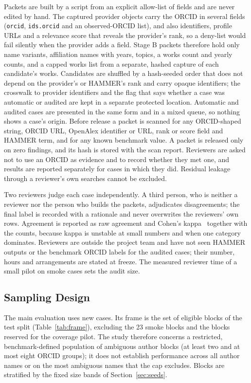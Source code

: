Packets are built by a script from an explicit allow-list of fields and are never edited by hand. The captured provider objects carry the ORCID in several fields (\texttt{orcid}, \texttt{ids.orcid} and an observed-ORCID list), and also identifiers, profile URLs and a relevance score that reveals the provider's rank, so a deny-list would fail silently when the provider adds a field. Stage B packets therefore hold only name variants, affiliation names with years, topics, a works count and yearly counts, and a capped works list from a separate, hashed capture of each candidate's works. Candidates are shuffled by a hash-seeded order that does not depend on the provider's or HAMMER's rank and carry opaque identifiers; the crosswalk to provider identifiers and the flag that says whether a case was automatic or audited are kept in a separate protected location. Automatic and audited cases are presented in the same form and in a mixed queue, so nothing shows a case's origin. Before release a packet is scanned for any ORCID-shaped string, ORCID URL, OpenAlex identifier or URL, rank or score field and HAMMER term, and for any known benchmark value. A packet is released only on zero findings, and its hash is stored with the scan report. Reviewers are asked not to use an ORCID as evidence and to record whether they met one, and results are reported separately for cases in which they did. Residual leakage through a reviewer's own searches cannot be excluded.

Two reviewers judge each case independently. A third person, who is neither a reviewer nor the person who builds the packets, adjudicates disagreements; the final label is recorded with a rationale and never overwrites the reviewers' own rows. Agreement is reported as raw agreement and Cohen's kappa~\cite{cohen1960kappa} together with the counts, because kappa is unstable at small numbers and when one category dominates. Reviewers are outside the project team and have not seen HAMMER outputs or the benchmark ORCID labels for the audited cases; their number, hours and arrangements are stated at freeze. The measured reviewer time of a small pilot on smoke cases sets the audit size.

\subsection{Sampling Design}
\label{sec:sampling}
The main evaluation uses new cases. Its frame is the set of eligible blocks of the test split (Table~\ref{tab:frame}), excluding the 23 smoke blocks and the blocks reserved for the coverage pilot. The study therefore concerns a restricted, benchmark-defined population of ambiguous author blocks (at least two and at most eight ORCID groups); it does not establish performance across all author names or on the most ambiguous names that the cap excludes. Blocks are stratified by the fixed size bands of Section~\ref{sec:seeds}.

